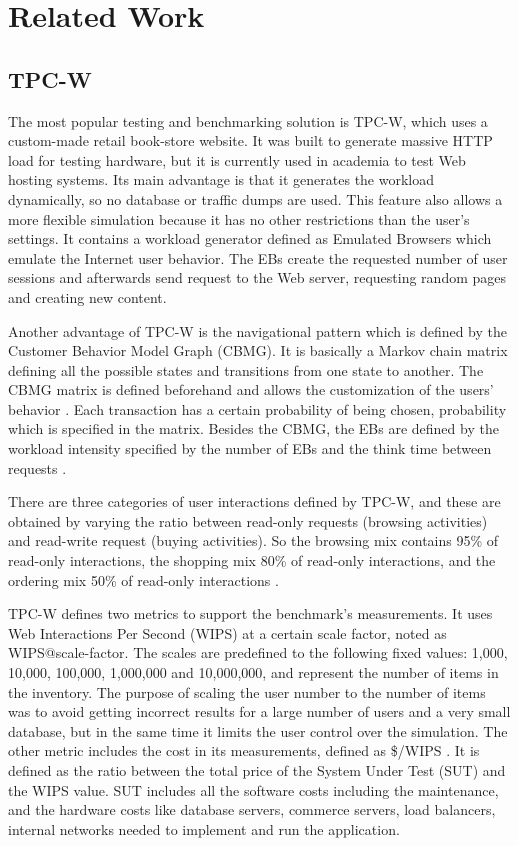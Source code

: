 \chapter{Related Work}
\label{chapter:chapter2}

\section{TPC-W}
\label{sec:tpcw}

The most popular testing and benchmarking solution is TPC-W, which uses a custom-made retail book-store website. It was built to generate massive HTTP load for testing hardware, but it is currently used in academia to test Web hosting systems. Its main advantage is that it generates the workload dynamically, so no database or traffic dumps are used. This feature also allows a more flexible simulation because it has no other restrictions than the user's settings. It contains a workload generator defined as Emulated Browsers which emulate the Internet user behavior. The EBs create the requested number of user sessions and afterwards send request to the Web server, requesting random pages and creating new content. 

Another advantage of TPC-W is the navigational pattern which is defined by the Customer Behavior Model Graph (CBMG). It is basically a Markov chain matrix defining all the possible states and transitions from one state to another. The CBMG matrix is defined beforehand and allows the customization of the users' behavior \cite{Menasce}. Each transaction has a certain probability of being chosen, probability which is specified in the matrix. Besides the CBMG, the EBs are defined by the workload intensity specified by the number of EBs and the think time between requests \cite{Pierre}.

There are three categories of user interactions defined by TPC-W, and these are obtained by varying the ratio between read-only requests (browsing activities) and read-write request (buying activities). So the browsing mix contains 95\% of read-only interactions, the shopping mix 80\% of read-only interactions, and the  ordering mix 50\% of  read-only interactions \cite{Amza}.

TPC-W defines two metrics to support the benchmark's measurements. It uses Web Interactions Per Second (WIPS) at a certain scale factor, noted as WIPS@scale-factor. The scales are predefined to the following fixed values: 1,000, 10,000, 100,000, 1,000,000 and 10,000,000, and represent the number of items in the inventory. The purpose of scaling the user number to the number of items was to avoid getting incorrect results for a large number of users and a very small database, but in the same time it limits the user control over the simulation. The other metric includes the cost in its measurements, defined as \$/WIPS \cite{Smith}. It is defined as the ratio between the total price of the System Under Test (SUT) and the WIPS value. SUT includes all the software costs including the maintenance, and the hardware costs like database servers, commerce servers, load balancers, internal networks needed to implement and run the application.

